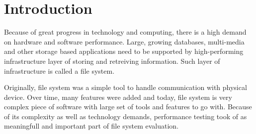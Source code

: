 \documentclass[
  color, %
  table, %
  lof,   %
  lot,   %
]{fithesis3}
\begin{document}
\chapter{Introduction}

Because of great progress in technology and computing, there is a high demand on hardware and software performance. Large, growing databases, multi-media and other storage based applications need to be supported by high-performing infrastructure layer of storing and retreiving information. Such layer of infrastructure is called a file system.

Originally, file system was a simple tool to handle communication with physical device. Over time, many features were added and today, file system is very complex piece of software with large set of tools and features to go with. Because of its complexity as well as technology demands, performance testing took of as meaningfull and important part of file system evaluation.



\end{document}
